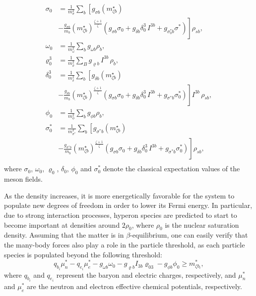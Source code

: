 \documentclass[twocolumn,showpacs,aps]{revtex4}
\begin{document}
\begin{equation}\begin{split}\label{tcm}
\sigma_{0}&=\frac{1}{m_{\sigma}^{2}}\underset{b}{\sum}
\left[g_{\sigma b}\left(m_{\zeta b}^{\star}\right) \right.
\\ & \left. -\frac{g_{\sigma b}}{m_b}
\left(m_{\zeta b}^{\star}\right)^{\frac{\zeta+1}{\zeta}}
\left(g_{\sigma b}\sigma_{0} + g_{\delta b}\delta_{0}^{3}\,I^{3b}+g_{\sigma_{0}^* b}\sigma^*\right)\right]\rho_{s b}, \\
\omega_{0}&=\frac{1}{m_{\omega}^{2}}\underset{b}{\sum}g_{\omega b}\rho_{b}, \\
\varrho_{0}^{3}&=\frac{1}{m_{\varrho}^{2}}\underset{B}{\sum}g_{\varrho b}\, I^{3b}\,\rho_{b},\\
\delta_{0}^{3}&=\frac{1}{m_{\delta}^{2}}\underset{b}{\sum}
\left[g_{\delta b}\left(m_{\zeta b}^{\star}\right) \right.
\\ & \left.-\frac{g_{\delta b}}{m_b}
\left(m_{\zeta b}^{\star}\right)^{\frac{\zeta+1}{\zeta}}
\left(g_{\sigma b}\sigma_{0} + g_{\delta b}\delta_{0}^{3}\,I^{3b}+g_{\sigma^* b}\sigma_{0}^*\right)\right]I^{3b}\,\rho_{s b},\\
\phi_{0}&=\frac{1}{m_{\phi}^{2}}\underset{b}{\sum}g_{\phi b}\rho_{b}, \\
\sigma^*_{0}&=\frac{1}{m_{\sigma^*}^{2}}\underset{b}{\sum}
\left[g_{\sigma^* b}\left(m_{\zeta b}^{\star}\right) \right.
\\ & \left. -\frac{g_{\sigma^* b}}{m_b}
\left(m_{\zeta b}^{\star}\right)^{\frac{\zeta+1}{\zeta}}
\left(g_{\sigma b}\sigma_{0} + g_{\delta b}\delta_{0}^{3}\,I^{3b}+g_{\sigma^* b}\sigma_{0}^*\right)\right]\rho_{s b}, \\
\end{split}\end{equation}
where $\sigma_{0}$, $\omega_{0}$, $\varrho_{0}$, $\delta_{0}$, $\phi_{0}$ and $\sigma^*_{0}$ denote 
the classical expectation values of the meson fields.

As the density increases, it is more energetically favorable for the system to populate new degrees of freedom
in order to lower its Fermi energy. In particular, due to strong interaction processes,
hyperon species are predicted to start to become important at densities around $2\rho_0$, 
where $\rho_0$ is the nuclear saturation density.
Assuming that the matter is in $\beta$-equilibrium, one can easily verify that the many-body forces also
play a role in the particle threshold, as each particle species is populated beyond the following threshold:
\begin{equation}\label{population}
 q_{b_i} \mu^*_{n} - q_{e_i} \mu^*_{e} - g_{\omega b}\omega_0 - g_{\varrho b}I_{3 b} \varrho_{03} - g_{\phi b}\phi_0 \geq m_{\zeta b_i}^{*},
\end{equation}
where $q_{b_i}$ and $q_{e_i}$ represent the baryon and electric charges, respectively, 
and $\mu^*_n$ and $\mu^*_e$ are the neutron and electron effective chemical potentials, respectively. 
\end{document}
